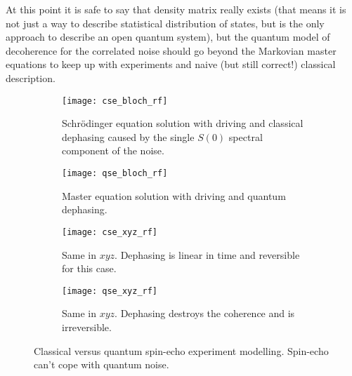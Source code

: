 \documentclass[12pt, twoside]{report}
\numberwithin{equation}{section}
\begin{document}
At this point it is safe to say that density matrix really exists (that means it is not just a way to describe statistical distribution of states, but is the only approach to describe an open quantum system), but the quantum model of decoherence for the correlated noise should go beyond the Markovian master equations to keep up with experiments and naive (but still correct!) classical description.\cite{Zurek2003}

\begin{figure}
\begingroup
\captionsetup[subfigure]{width=0.9\textwidth}
\centering
\begin{subfigure}[t]{0.45\textwidth}
\centering
\texttt{[image: cse\_bloch\_rf]}
\caption{Schrödinger equation solution with driving and classical dephasing caused by the single $S(0)$ spectral component of the noise.}
\end{subfigure}
\begin{subfigure}[t]{0.45\textwidth}
\centering
\texttt{[image: qse\_bloch\_rf]}
\caption{Master equation solution with driving and quantum dephasing.}
\end{subfigure}

\begin{subfigure}[t]{0.45\textwidth}
\centering
\texttt{[image: cse\_xyz\_rf]}
\caption{Same in $xyz$. Dephasing is linear in time and reversible for this case.}
\end{subfigure}
\begin{subfigure}[t]{0.45\textwidth}
\centering
\texttt{[image: qse\_xyz\_rf]}
\caption{Same in $xyz$. Dephasing destroys the coherence and is irreversible.}
\end{subfigure}
\caption{Classical versus quantum spin-echo experiment modelling. Spin-echo can't cope with quantum noise.}
\label{fig:se}
\endgroup

\end{figure}



\end{document}

